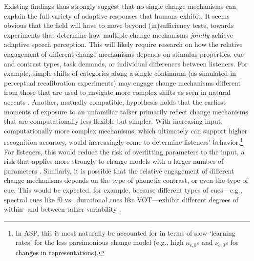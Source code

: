 \documentclass[
  11pt,
  man,floatsintext]{apa6}
\begin{document}
Existing findings thus strongly suggest that no single change mechanisms can explain the full variety of adaptive responses that humans exhibit. It seems obvious that the field will have to move beyond (in)sufficiency tests, towards experiments that determine how multiple change mechanisms \emph{jointly} achieve adaptive speech perception. This will likely require research on how the relative engagement of different change mechanisms depends on stimulus properties, cue and contrast types, task demands, or individual differences between listeners. For example, simple shifts of categories along a single continuum (as simulated in perceptual recalibration experiments) may engage change mechanisms different from those that are used to navigate more complex shifts as seen in natural accents \autocites[for discussion, see][]{bent-baeseberk2021,samuel-kraljic2009,zheng-samuel2020}. Another, mutually compatible, hypothesis holds that the earliest moments of exposure to an unfamiliar talker primarily reflect change mechanisms that are computationally less flexible but simpler. With increasing input, computationally more complex mechanisms, which ultimately can support higher recognition accuracy, would increasingly come to determine listeners' behavior.\footnote{In ASP, this is most naturally be accounted for in terms of slow `learning rates' for the less parsimonious change model (e.g., high \(\kappa_{c,0}\)s and \(\nu_{c,0}\)s for changes in representations).} For listeners, this would reduce the risk of overfitting parameters to the input, a risk that applies more strongly to change models with a larger number of parameters \autocites[for discussion, see][]{apfelbaum-mcmurray2015,kleinschmidt-jaeger2015,toscano-mcmurray2010}. Similarly, it is possible that the relative engagement of different change mechanisms depends on the type of phonetic contrast, or even the type of cue. This would be expected, for example, because different types of cues---e.g., spectral cues like f0 vs.~durational cues like VOT---exhibit different degrees of within- and between-talker variability \autocites[see discussions in][179-180]{kleinschmidt-jaeger2015}{kraljic-samuel2007,xie2021cognition}.
\end{document}
